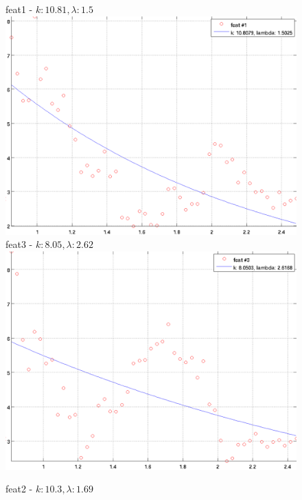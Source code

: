 \documentclass[12pt]{report}
\begin{document}
\newcommand{\imFeat}{.42}
\begin{figure}[H]
\begin{minipage}[t]{0.5\linewidth}
	\centering
	feat1 - $k: 10.81, \lambda: 1.5 $\\
	\includegraphics[scale=\imFeat]{images/feat1}\\
	feat3 - $k: 8.05, \lambda: 2.62 $\\
	\includegraphics[scale=\imFeat]{images/feat3}\\
\end{minipage}
\begin{minipage}[t]{0.5\linewidth}
	\centering
	feat2 - $k: 10.3, \lambda: 1.69 $\\

\end{minipage}
\end{figure}
\end{document}
